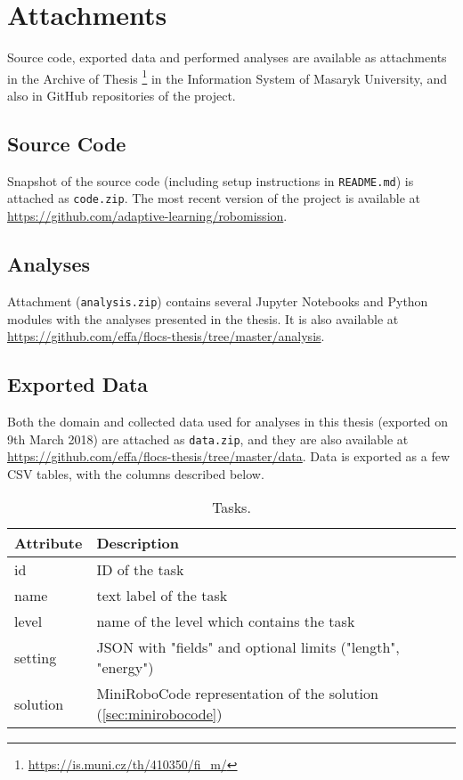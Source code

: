 \chapter{Attachments}
\label{chap:attachments}

Source code, exported data and performed analyses
are available as attachments in the Archive of Thesis%
\footnote{\url{https://is.muni.cz/th/410350/fi\_m/}}
in the Information System of Masaryk University,
and also in GitHub repositories of the project. %

\section{Source Code}
\label{sec:attachment.source-code}

Snapshot of the source code
(including setup instructions in \texttt{README.md})
is attached as \texttt{code.zip}.
The most recent version of the project is available at
\url{https://github.com/adaptive-learning/robomission}.

\section{Analyses}
\label{sec:attachment.analyses}

Attachment (\texttt{analysis.zip})
contains several Jupyter Notebooks and Python modules with the analyses
presented in the thesis.
It is also available at
\url{https://github.com/effa/flocs-thesis/tree/master/analysis}.

\section{Exported Data}
\label{sec:attachment.collected-data}

Both the domain and collected data used for analyses in this
thesis (exported on 9th March 2018) are attached as
\texttt{data.zip}, and they are also available at
\url{https://github.com/effa/flocs-thesis/tree/master/data}.
Data is exported as a few CSV tables,
with the columns described below.

\begin{table}[htb]
\centering
\caption{Tasks.}
\begin{tabular}{l l}
\toprule
Attribute & Description \\
\midrule
id & ID of the task \\
name & text label of the task \\
level & name of the level which contains the task \\
setting & JSON with "fields" and optional limits ("length", "energy") \\
solution & MiniRoboCode representation of the solution (\cref{sec:minirobocode}) \\
\bottomrule
\end{tabular}
\end{table}

